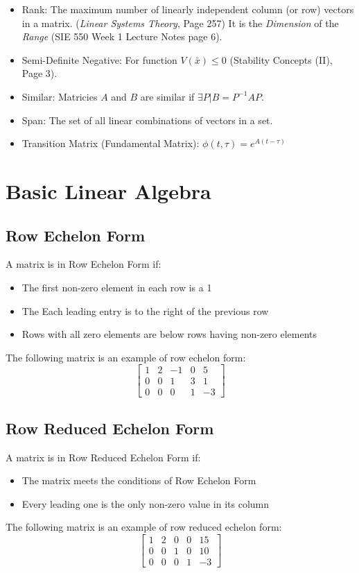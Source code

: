 \documentclass[12pt]{article}
\begin{document}
\begin{itemize}
\item Rank: The maximum number of linearly independent column (or row) vectors in a matrix. ({\em Linear Systems Theory}, Page 257) It is the { \em Dimension} of the {\em Range} (SIE 550 Week 1 Lecture Notes page 6).

\item Semi-Definite Negative: For function $V(\bar{x})\leq0$ (Stability Concepts (II), Page 3). 

\item Similar: Matricies $A$ and $B$ are similar if $\exists P | B=P^{-1}AP$.

\item Span: The set of all linear combinations of vectors in a set. 

\item Transition Matrix (Fundamental Matrix): $\phi(t,\tau)=e^{A(t-\tau)}$

\end{itemize}

\newpage
\section*{Basic Linear Algebra}
\subsection*{Row Echelon Form}
A matrix is in Row Echelon Form if:
\begin{itemize}
	\item The first non-zero element in each row is a 1
	\item The Each leading entry is to the right of the previous row
	\item Rows with all zero elements are below rows having non-zero elements
\end{itemize}
\noindent
The following matrix is an example of row echelon form:
$$
\begin{bmatrix}
	1 & 2 & -1 & 0 & 5 \\
	0 & 0 & 1 & 3 & 1 \\
	0 & 0 & 0 & 1 & -3 
\end{bmatrix} 
$$

\subsection*{Row Reduced Echelon Form}
A matrix is in Row Reduced Echelon Form if:
\begin{itemize}
	\item The matrix meets the conditions of Row Echelon Form
	\item Every leading one is the only non-zero value in its column
\end{itemize}
\noindent
The following matrix is an example of row reduced echelon form:
$$
\begin{bmatrix}
	1 & 2 & 0 & 0 & 15 \\
	0 & 0 & 1 & 0 & 10 \\
	0 & 0 & 0 & 1 & -3 
\end{bmatrix} 
$$
\end{document}
